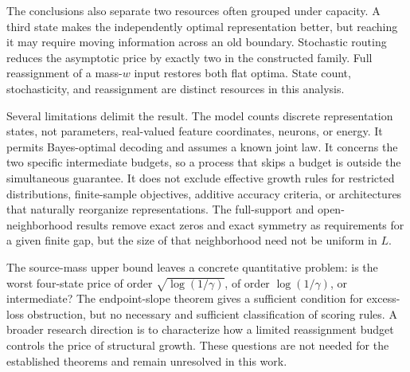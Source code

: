 \documentclass[11pt]{article}
\theoremstyle{remark}\newtheorem{remark}[theorem]{Remark}
\begin{document}
The conclusions also separate two resources often grouped under capacity.
A third state makes the independently optimal representation better, but
reaching it may require moving information across an old boundary.
Stochastic routing reduces the asymptotic price by exactly two in the
constructed family. Full reassignment of a mass-$w$ input restores both
flat optima. State count, stochasticity, and reassignment are distinct
resources in this analysis.

Several limitations delimit the result. The model counts discrete
representation states, not parameters, real-valued feature coordinates,
neurons, or energy. It permits Bayes-optimal decoding and assumes a known
joint law. It concerns the two specific intermediate budgets, so a process
that skips a budget is outside the simultaneous guarantee. It does not
exclude effective growth rules for restricted distributions, finite-sample
objectives, additive accuracy criteria, or architectures that naturally
reorganize representations. The full-support and open-neighborhood results
remove exact zeros and exact symmetry as requirements for a given finite
gap, but the size of that neighborhood need not be uniform in $L$.

The source-mass upper bound leaves a concrete quantitative problem: is the
worst four-state price of order $\sqrt{\log(1/\gamma)}$, of order
$\log(1/\gamma)$, or intermediate? The endpoint-slope theorem gives a
sufficient condition for excess-loss obstruction, but no necessary and
sufficient classification of scoring rules. A broader research direction
is to characterize how a limited reassignment budget controls the price
of structural growth. These questions are not needed for the established
theorems and remain unresolved in this work.

\clearpage
\begingroup
\small\raggedright


\endgroup
\end{document}
